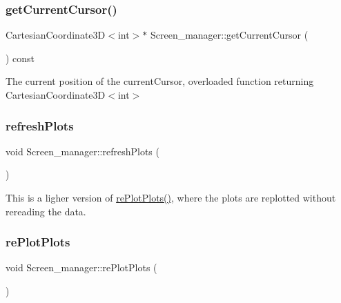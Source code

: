 \subsubsection{\texorpdfstring{get\+Current\+Cursor()}{getCurrentCursor()}\hspace{0.1cm}{\footnotesize\ttfamily [2/2]}}
{\footnotesize\ttfamily Cartesian\+Coordinate3D$<$int$>$$\ast$ Screen\+\_\+manager\+::get\+Current\+Cursor (\begin{DoxyParamCaption}{ }\end{DoxyParamCaption}) const\hspace{0.3cm}{\ttfamily [inline]}}

The current position of the current\+Cursor, overloaded function returning Cartesian\+Coordinate3\+D$<$int$>$ \mbox{\label{classScreen__manager_a846061886a15cdc0de881976564b02f2}} 
\subsubsection{\texorpdfstring{refresh\+Plots}{refreshPlots}}
{\footnotesize\ttfamily void Screen\+\_\+manager\+::refresh\+Plots (\begin{DoxyParamCaption}{ }\end{DoxyParamCaption})\hspace{0.3cm}{\ttfamily [slot]}}

This is a ligher version of \mbox{\hyperlink{classScreen__manager_a0a17fba71b72fedefed5651b883ed371}{re\+Plot\+Plots()}}, where the plots are replotted without rereading the data. \mbox{\label{classScreen__manager_a0a17fba71b72fedefed5651b883ed371}} 
\subsubsection{\texorpdfstring{re\+Plot\+Plots}{rePlotPlots}}
{\footnotesize\ttfamily void Screen\+\_\+manager\+::re\+Plot\+Plots (\begin{DoxyParamCaption}{ }\end{DoxyParamCaption})\hspace{0.3cm}{\ttfamily [slot]}}

